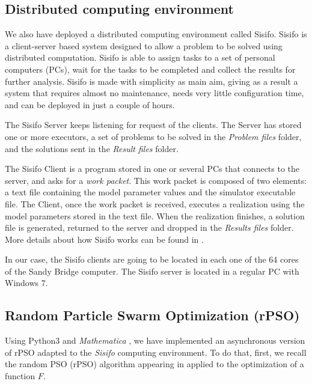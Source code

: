 \subsection{Distributed computing environment}
We also have deployed a distributed computing environment called Sisifo. Sisifo is a client-server based system designed to allow a problem to be solved using distributed computation. Sisifo is able to assign tasks to a set of personal computers (PCs), wait for the tasks to be completed and collect the results for further analysis. Sisifo is made with simplicity as main aim, giving as a result a system that requires almost no maintenance, needs very little configuration time, and can be deployed in just a couple of hours.

The Sisifo Server keeps listening for request of the clients. The Server has stored one or more executors, a set of problems to be solved in the \textit{Problem files} folder, and the solutions sent in the \textit{Result files} folder. 

The Sisifo Client is a program stored in one or several PCs that connects to the server, and asks for a \textit{work packet}. This work packet is composed of two elements: a text file containing the model parameter values and the simulator executable file. The Client, once the work packet is received, executes a realization using the model parameters stored in the text file. When the realization finishes, a solution file is generated, returned to the server and dropped in the \textit{Results files} folder. More details about how Sisifo works can be found in \cite{villanueva2013epidemic}.

In our case, the Sisifo clients are going to be located in each one of the 64 cores of the Sandy Bridge computer. The Sisifo server is located in a regular PC with Windows 7.

\subsection{Random Particle Swarm Optimization (rPSO)}
Using Python3 \cite{python3} and \textit{Mathematica} \cite{Mathematica}, we have implemented an asynchronous version of rPSO adapted to the  \textit{Sisifo} computing environment. To do that, first, we recall the random PSO (rPSO) algorithm appearing in \cite{khemka2008exploratory} applied to the optimization of a function $F$.

